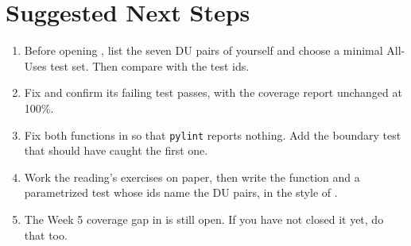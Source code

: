 \documentclass[11pt]{article}
\begin{document}
\section{Suggested Next Steps}
\begin{enumerate}
\item Before opening , list the seven
DU pairs of  yourself and choose a minimal All-Uses
test set. Then compare with the test ids.
\item Fix  and confirm its
failing test passes, with the coverage report unchanged at 100\%.
\item Fix both functions in  so that
\texttt{pylint} reports nothing. Add the boundary test that should
have caught the first one.
\item Work the reading's  exercises on paper,
then write the function and a parametrized test whose ids name the DU
pairs, in the style of .
\item The Week 5 coverage gap in 
is still open. If you have not closed it yet, do that too.
\end{enumerate}
\end{document}
